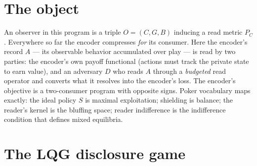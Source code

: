 \documentclass[11pt]{article}
\theoremstyle{definition}
\begin{document}
\begin{abstract}
(Theorem~\ref{thm:nogap}) and open otherwise. The discrete twin (binary
alphabet) is settled at probe level: the tie survives exactly, the
pricing generalizes, mixing is the carrier of dither, and a fifth
class appears that LQG forbids. Verification: the governed harness
(\texttt{experiments/go16\_verify\_partition.py}, ALL PASS 9/9) passed
the statement since refuted, its V6 gate being circular (NEG-17); the
corrected Theorem~\ref{thm:diagonal} is netted by
\texttt{experiments/verify\_go16\_diagonal.py} (9/9, in CI); twin probe ALL
PASS 4/4 (\texttt{experiments/go16\_discrete\_twin.py}); eight theorems
machine-checked in Lean~4/Mathlib
(\texttt{lean/ObservationTheory/AdversarialObserver.lean}, built
clean on Atlas, zero \texttt{sorry}); a fresh-context R-IND-5 pass on
v0.2 found 2 exposition errors, 3 gaps and 2 overclaims, addressed in
v0.3; a re-check on 2026-11-20 (VI-30) then found Theorem 3 false as
sealed (the blackout regime, NEG-17), and the corrected statements in
this version are R-IND-5 pending. Novelty flank on record: the composite game is
unoccupied; the SDP-ization machinery is imported
(Sayin--Akyol--Ba\c{s}ar; Tamura), the tie's optimization ancestor is
Overton--Womersley coalescence, and the partition/pricing/water-level
theorem is the headline novelty.
\end{abstract}

\section{The object}

An observer in this program is a triple $O=(C,G,B)$ inducing a read
metric $P_C$. Everywhere so far the encoder compresses \emph{for}
its consumer. Here the encoder's record $A$ --- its observable
behavior accumulated over play --- is read by two parties: the
encoder's own payoff functional (actions must track the private
state to earn value), and an adversary $D$ who reads $A$ through a
\emph{budgeted} read operator and converts what it resolves into the
encoder's loss. The encoder's objective is a two-consumer program
with opposite signs. Poker vocabulary maps exactly: the ideal policy
$S$ is maximal exploitation; shielding is balance; the reader's
kernel is the bluffing space; reader indifference is the
indifference condition that defines mixed equilibria.

\section{The LQG disclosure game}
\end{document}
